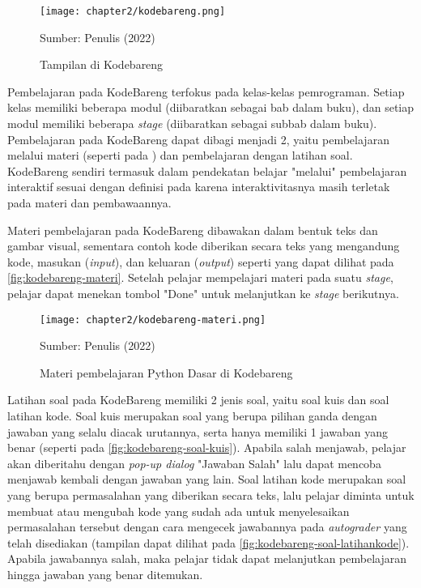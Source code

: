 \begin{figure}[H]
  \centering
  \texttt{[image: chapter2/kodebareng.png]}
  \caption{Tampilan di Kodebareng}\label{fig:kodebareng-tampilan}
  Sumber: Penulis (2022)
\end{figure}

Pembelajaran pada KodeBareng terfokus pada kelas-kelas pemrograman. Setiap kelas memiliki beberapa modul (diibaratkan sebagai bab dalam buku), dan setiap modul memiliki beberapa \textit{stage} (diibaratkan sebagai subbab dalam buku). Pembelajaran pada KodeBareng dapat dibagi menjadi 2, yaitu pembelajaran melalui materi (seperti pada ) dan pembelajaran dengan latihan soal. KodeBareng sendiri termasuk dalam pendekatan belajar "melalui" pembelajaran interaktif sesuai dengan definisi pada \textcite{reeves2012interactive} karena interaktivitasnya masih terletak pada materi dan pembawaannya.

Materi pembelajaran pada KodeBareng dibawakan dalam bentuk teks dan gambar visual, sementara contoh kode diberikan secara teks yang mengandung kode, masukan (\textit{input}), dan keluaran (\textit{output}) seperti yang dapat dilihat pada \autoref{fig:kodebareng-materi}. Setelah pelajar mempelajari materi pada suatu \textit{stage}, pelajar dapat menekan tombol "Done" untuk melanjutkan ke \textit{stage} berikutnya.

\begin{figure}[H]
  \centering
  \texttt{[image: chapter2/kodebareng-materi.png]}
  \caption{Materi pembelajaran Python Dasar di Kodebareng}\label{fig:kodebareng-materi}
  Sumber: Penulis (2022)
\end{figure}

Latihan soal pada KodeBareng memiliki 2 jenis soal, yaitu soal kuis dan soal latihan kode. Soal kuis merupakan soal yang berupa pilihan ganda dengan jawaban yang selalu diacak urutannya, serta hanya memiliki 1 jawaban yang benar (seperti pada \autoref{fig:kodebareng-soal-kuis}). Apabila salah menjawab, pelajar akan diberitahu dengan \textit{pop-up dialog} "Jawaban Salah" lalu dapat mencoba menjawab kembali dengan jawaban yang lain. Soal latihan kode merupakan soal yang berupa permasalahan yang diberikan secara teks, lalu pelajar diminta untuk membuat atau mengubah kode yang sudah ada untuk menyelesaikan permasalahan tersebut dengan cara mengecek jawabannya pada \textit{autograder} yang telah disediakan (tampilan dapat dilihat pada \autoref{fig:kodebareng-soal-latihankode}). Apabila jawabannya salah, maka pelajar tidak dapat melanjutkan pembelajaran hingga jawaban yang benar ditemukan.

